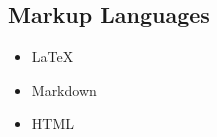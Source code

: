 \documentclass[10pt,a4paper,sans]{moderncv}
\begin{document}
\subsection{Markup Languages}
\vspace{-10pt}
\begin{multicols}{3}
 \begin{itemize}%
  \item {\large{}\selectfont\LaTeX}\\
        \raggedright\normalsize
  \item Markdown
  \item HTML
 \end{itemize}
\end{multicols}
\vspace{-15pt}
\end{document}
